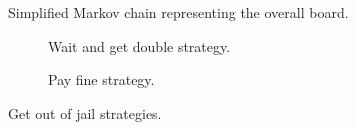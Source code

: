 
\newpage
\begin{figure}[H]
  \begin{center}
    
  \end{center}
  \caption{Simplified Markov chain representing the overall board.}
  \label{fig:markov_monop}
\end{figure}

\begin{figure}[H] %
    \begin{subfigure}[b]{0.5\textwidth}
      
      \caption{Wait and get double strategy.}
      \label{fig:jail_double}
    \end{subfigure}
    \hspace{3cm}
    \begin{subfigure}[b]{0.24\textwidth}
      
      \caption{Pay fine strategy.}
      \label{fig:jail_pay}
    \end{subfigure}
  \caption{Get out of jail strategies.}
\end{figure}

\newpage


